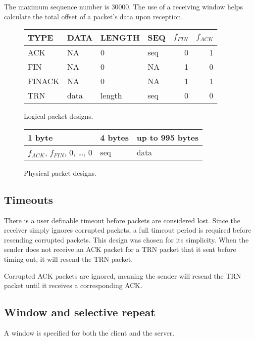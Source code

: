 \documentclass[letterpaper,twocolumn,10pt]{article}
\begin{document}
The maximum sequence number is 30000.
The use of a receiving window helps calculate the total offset of a packet's data upon reception.

\begin{figure}[h]
\begin{tabular}{l l l l r r}
  TYPE & DATA & LENGTH & SEQ & $f_{FIN}$ & $f_{ACK}$\\
  \hline
  ACK & NA & 0 & seq & 0 & 1 \\
  FIN & NA & 0 & NA & 1 & 0 \\
  FINACK & NA & 0 & NA & 1 & 1 \\
  TRN & data & length & seq & 0 & 0 \\
\end{tabular}
\caption{Logical packet designs.}
\label{tab:lg_pkt}
\end{figure}

\begin{figure}[h]
\begin{tabular}{|l | l | l|}
  \hline
  1 byte & 4 bytes & up to 995 bytes\\
  \hline
  $f_{ACK}$, $f_{FIN}$, 0, \dots, 0 & seq & data\\
  \hline
\end{tabular}
\caption{Physical packet designs.}
\label{tab:py_pkt}
\end{figure}

\subsection{Timeouts}
There is a user definable timeout before packets are considered lost.
Since the receiver simply ignores corrupted packets, a full timeout period is required before resending corrupted packets.
This design was chosen for its simplicity.
When the sender does not receive an ACK packet for a TRN packet that it sent before timing out, it will resend the TRN packet.

Corrupted ACK packets are ignored, meaning the sender will resend the TRN packet until it receives a corresponding ACK.

\subsection{Window and selective repeat}
A window is specified for both the client and the server.
\end{document}
